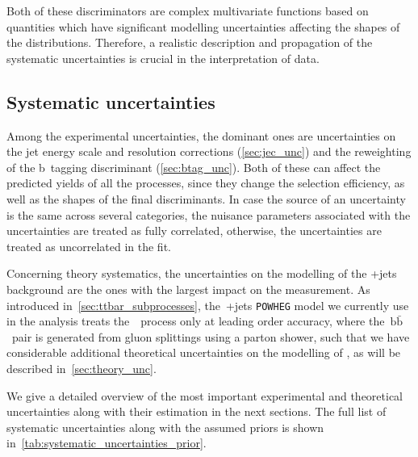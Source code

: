 Both of these discriminators are complex multivariate functions based on quantities which have significant modelling uncertainties affecting the shapes of the distributions. Therefore, a realistic description and propagation of the systematic uncertainties is crucial in the interpretation of data.

\subsection{Systematic uncertainties}
\label{sec:systematic_unc}
Among the experimental uncertainties, the dominant ones are uncertainties on the jet energy scale and resolution corrections (\cref{sec:jec_unc}) and the reweighting of the b~tagging discriminant (\cref{sec:btag_unc}). Both of these can affect the predicted yields of all the processes, since they change the selection efficiency, as well as the shapes of the final discriminants. In case the source of an uncertainty is the same across several categories, the nuisance parameters associated with the uncertainties are treated as fully correlated, otherwise, the uncertainties are treated as uncorrelated in the fit.

Concerning theory systematics, the uncertainties on the modelling of the \ttbar+jets background are the ones with the largest impact on the measurement. As introduced in~\cref{sec:ttbar_subprocesses}, the~\ttbar+jets \texttt{POWHEG} model we currently use in the analysis treats the~\ttbb~process only at leading order accuracy, where the~$\mathrm{b}\bar{\mathrm{b}}$~pair is generated from gluon splittings using a parton shower, such that we have considerable additional theoretical uncertainties on the modelling of \ttbb, as will be described in~\cref{sec:theory_unc}.

We give a detailed overview of the most important experimental and theoretical uncertainties along with their estimation in the next sections. The full list of systematic uncertainties along with the assumed priors is shown in~\cref{tab:systematic_uncertainties_prior}.

